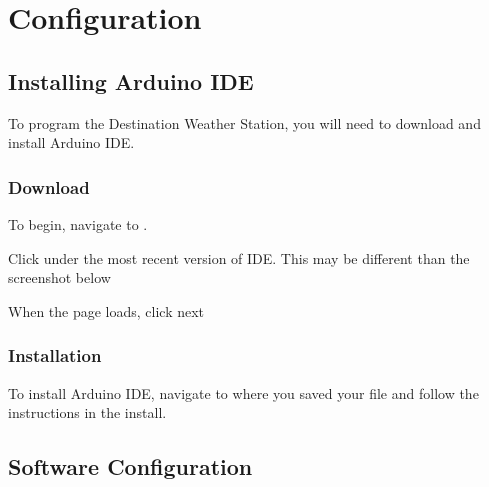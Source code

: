 \documentclass[letterpaper,10pt,english]{sphinxmanual}
\begin{document}
\chapter{Configuration}
\label{\detokenize{index:configuration}}
\sphinxstepscope


\section{Installing Arduino IDE}
\label{\detokenize{software/install-arduino-ide:installing-arduino-ide}}\label{\detokenize{software/install-arduino-ide:install-arduino-ide}}\label{\detokenize{software/install-arduino-ide::doc}}
\sphinxAtStartPar
To program the Destination Weather Station, you will need to download and install Arduino IDE.


\subsection{Download}
\label{\detokenize{software/install-arduino-ide:download}}
\sphinxAtStartPar
To begin, navigate to .

\sphinxAtStartPar
Click  under the most recent version of IDE. This may be different than the screenshot below


\sphinxAtStartPar
When the page loads, click next




\subsection{Installation}
\label{\detokenize{software/install-arduino-ide:installation}}
\sphinxAtStartPar
To install Arduino IDE, navigate to where you saved your  file and follow the instructions in the install.


\section{Software Configuration}
\label{\detokenize{software/install-arduino-ide:software-configuration}}
\end{document}
